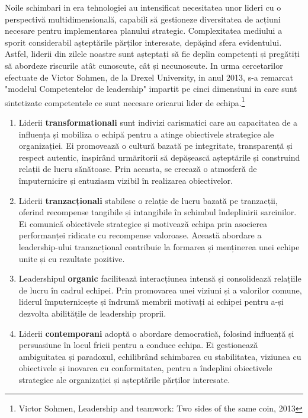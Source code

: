 \documentclass[a4paper, 12pt]{article}
\begin{document}
	\quad\quad Noile schimbari in era tehnologiei au intensificat necesitatea unor lideri cu o perspectivă multidimensională, capabili să gestioneze diversitatea de acțiuni necesare pentru implementarea planului strategic. Complexitatea mediului a sporit considerabil așteptările părților interesate, depășind sfera evidentului. Astfel, liderii din zilele noastre sunt așteptați să fie deplin competenți și pregătiți să abordeze riscurile atât cunoscute, cât și necunoscute. In urma cercetarilor efectuate de Victor Sohmen, de la Drexel University, in anul 2013, s-a remarcat "modelul Competentelor de leadership" impartit pe cinci dimensiuni in care sunt sintetizate competentele ce sunt necesare oricarui lider de echipa.\footnote {Victor Sohmen, Leadership and teamwork: Two sides of the same coin, 2013}

	\begin{enumerate}[(1)]

		\item Liderii \textbf {transformationali}  sunt indivizi carismatici care au capacitatea de a influența și mobiliza o echipă pentru a atinge obiectivele strategice ale organizației. Ei promovează o cultură bazată pe integritate, transparență și respect autentic, inspirând urmăritorii să depășească așteptările și construind relații de lucru sănătoase. Prin aceasta, se creează o atmosferă de împuternicire și entuziasm vizibil în realizarea obiectivelor.

		\item Liderii \textbf {tranzacționali} stabilesc o relație de lucru bazată pe tranzacții, oferind recompense tangibile și intangibile în schimbul îndeplinirii sarcinilor. Ei comunică obiectivele strategice și motivează echipa prin asocierea performanței ridicate cu recompense valoroase. Această abordare a leadership-ului tranzacțional contribuie la formarea și menținerea unei echipe unite și cu rezultate pozitive.

		\item Leadershipul \textbf {organic} facilitează interacțiunea intensă și consolidează relațiile de lucru în cadrul echipei. Prin promovarea unei viziuni și a valorilor comune, liderul împuternicește și îndrumă membrii motivați ai echipei pentru a-și dezvolta abilitățile de leadership proprii.
		
		\item Liderii \textbf{contemporani}  adoptă o abordare democratică, folosind influență și persuasiune în locul fricii pentru a conduce echipa. Ei gestionează ambiguitatea și paradoxul, echilibrând schimbarea cu stabilitatea, viziunea cu obiectivele și inovarea cu conformitatea, pentru a îndeplini obiectivele strategice ale organizației și așteptările părților interesate.


\end{enumerate}
\end{document}

